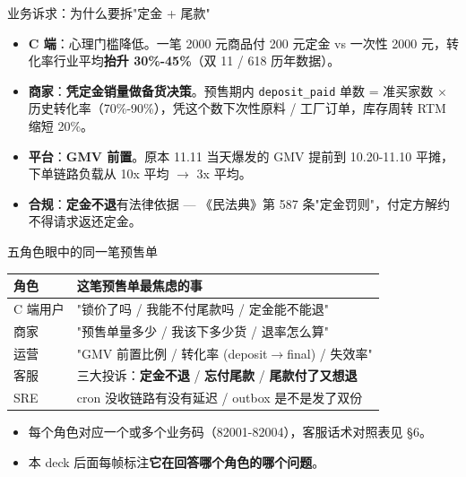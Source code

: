 \documentclass[aspectratio=169,11pt]{beamer}
\begin{document}
\begin{frame}[shrink]{业务诉求：为什么要拆"定金 + 尾款"}
\begin{itemize}\small
  \item \textbf{C 端}：心理门槛降低。一笔 2000 元商品付 200 元定金 vs 一次性 2000 元，转化率行业平均\textbf{抬升 30\%-45\%}（双 11 / 618 历年数据）。
  \item \textbf{商家}：\textbf{凭定金销量做备货决策}。预售期内 \texttt{deposit\_paid} 单数 = 准买家数 $\times$ 历史转化率（70\%-90\%），凭这个数下次性原料 / 工厂订单，库存周转 RTM 缩短 20\%。
  \item \textbf{平台}：\textbf{GMV 前置}。原本 11.11 当天爆发的 GMV 提前到 10.20-11.10 平摊，下单链路负载从 10x 平均 $\to$ 3x 平均。
  \item \textbf{合规}：\textbf{定金不退}有法律依据 — 《民法典》第 587 条"定金罚则"，付定方解约不得请求返还定金。
\end{itemize}
\end{frame}

\begin{frame}[shrink]{五角色眼中的同一笔预售单}
\small
\begin{tabular}{@{}lp{8.5cm}@{}}
\toprule
角色 & 这笔预售单最焦虑的事 \\
\midrule
C 端用户 & "锁价了吗 / 我能不付尾款吗 / 定金能不能退" \\
商家     & "预售单量多少 / 我该下多少货 / 退率怎么算" \\
运营     & "GMV 前置比例 / 转化率 (deposit$\to$final) / 失效率" \\
客服     & 三大投诉：\textbf{定金不退} / \textbf{忘付尾款} / \textbf{尾款付了又想退} \\
SRE      & cron 没收链路有没有延迟 / outbox 是不是发了双份 \\
\bottomrule
\end{tabular}
\vspace{2mm}
\begin{itemize}\small
  \item 每个角色对应一个或多个业务码（82001-82004），客服话术对照表见 §6。
  \item 本 deck 后面每帧标注\textbf{它在回答哪个角色的哪个问题}。
\end{itemize}
\end{frame}
\end{document}
